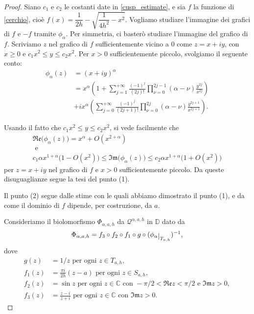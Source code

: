 \begin{proof}
    Siano $c_1$ e $c_2$ le costanti date in \eqref{cusp_estimate}, e sia $f$ la funzione di \eqref{cerchio}, cioè $f(x)=\dfrac{1}{2h}-\sqrt{\dfrac{1}{4h^2}-x^2}$. Vogliamo studiare l'immagine dei grafici di $f$ e $-f$ tramite $\phi_\alpha$. Per simmetria, ci basterò studiare l'immagine del grafico di $f$. Scriviamo $z$ nel grafico di $f$ sufficientemente vicino a $0$ come $z=x+iy$, con $x \ge 0$ e $c_1x^2\le y\le c_2x^2$. Per $x>0$ sufficientemente piccolo, svolgiamo il seguente conto:
    \begin{align*}
        \phi_\alpha(z)&=(x+iy)^{\alpha}\\
        &=x^{\alpha}\left(1+\sum_{j=1}^{+\infty}\frac{(-1)^j}{(2j)!}\prod_{\nu=0}^{2j-1}(\alpha-\nu)\frac{y^{2j}}{x^{2j}}\right)\\
        &+ix^{\alpha}\left(\sum_{j=0}^{+\infty}\frac{(-1)^j}{(2j+1)!}\prod_{\nu=0}^{2j}(\alpha-\nu)\frac{y^{2j+1}}{x^{2j+1}}\right).
    \end{align*}

    Usando il fatto che $c_1x^2\le y\le c_2x^2$, si vede facilmente che
    \begin{gather*}
        \mathfrak{Re}\big(\phi_\alpha(z)\big)=x^\alpha+O(x^{2+\alpha})\\
        \text{ e }\\
        c_1\alpha x^{1+\alpha}\big(1-O(x^2)\big) \le \mathfrak{Im}\big(\phi_\alpha(z)\big) \le c_2\alpha x^{1+\alpha}\big(1+O(x^2)\big)
    \end{gather*}
    per $z=x+iy$ nel grafico di $f$ e $x>0$ sufficientemente piccolo. Da queste disuguaglianze segue la tesi del punto (1).

    Il punto (2) segue dalle stime con le quali abbiamo dimostrato il punto (1), e da come il dominio di $f$ dipende, per costruzione, da $a$.

    Consideriamo il biolomorfismo $\Phi_{\alpha,a,h}$ da $\mathcal{Q}^{\alpha,a,h}$ in $\mathbb{D}$ dato da
    $$\Phi_{\alpha,a,h}=f_3\circ f_2\circ f_1\circ g\circ(\phi_\alpha\restrict{T_{a,h}})^{-1},$$
    dove
    \begin{align*}
        g(z)&=1/z\text{ per ogni }z\in T_{a,h},\\
        f_1(z)&=\frac{\pi i}{2h}(z-a)\text{ per ogni }z\in S_{a,h},\\
        f_2(z)&=\sin{z}\text{ per ogni }z\in \mathbb{C}\text{ con }-\pi/2<\mathfrak{Re}z<\pi/2\text{ e }\mathfrak{Im}z>0,\\
        f_3(z)&=\frac{z-i}{z+i}\text{ per ogni }z\in\mathbb{C}\text{ con }\mathfrak{Im}z>0.
    \end{align*}


\end{proof}
